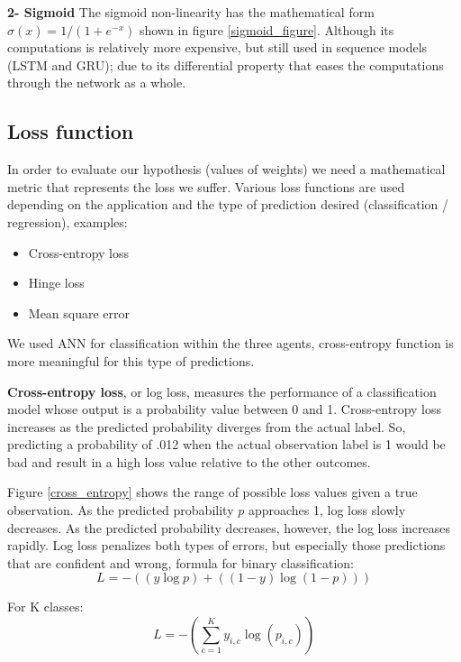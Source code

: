 \textbf{2- Sigmoid} The sigmoid non-linearity has the mathematical form  $\sigma (x) = 1/(1 +  e^{-x})$ shown in figure \ref{sigmoid_figure}. Although its computations is relatively more expensive, but still used in sequence models (LSTM and GRU); due to its differential property that eases the computations through the network as a whole.


\subsection{Loss function}
\label{sec:loss function}
In order to evaluate our hypothesis (values of weights) we need a mathematical metric that represents the loss we suffer. Various loss functions are used depending on the application and the type of prediction desired (classification / regression), examples:

\begin{itemize}
    \item Cross-entropy loss
    \item Hinge loss
    \item Mean square error
\end{itemize}

We used ANN for classification within the three agents, cross-entropy function is more meaningful for this type of predictions.\newline

\textbf{Cross-entropy loss}, or log loss, measures the performance of a classification model whose output is a probability value between 0 and 1. Cross-entropy loss increases as the predicted probability diverges from the actual label. So, predicting a probability of .012 when the actual observation label is 1 would be bad and result in a high loss value relative to the other outcomes.

Figure \ref{cross_entropy} shows the range of possible loss values given a true observation. As the predicted probability $p$ approaches 1, log loss slowly decreases. As the predicted probability decreases, however, the log loss increases rapidly. Log loss penalizes both types of errors, but especially those predictions that are confident and wrong, formula for binary classification:
\begin{equation} \label{eq:cross_entropy}
L = - \left( (y \log {p}) + ( (1-y)\log{(1-p)} )  \right)
\end{equation}

For K classes:
\begin{equation}\label{eq:cross_entropy_2}
L = - \left(  \sum_{c=1}^{K} y_{i,c} \log {(p_{i,c})}  \right)
\end{equation}



